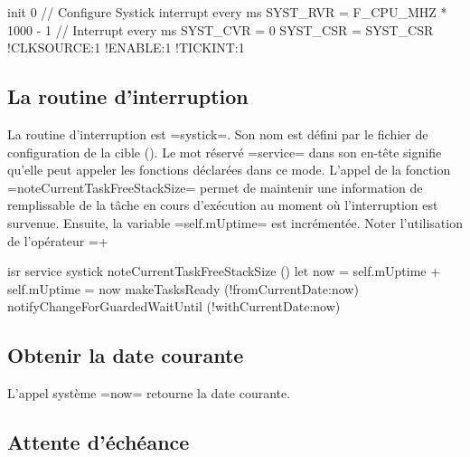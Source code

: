 \begin{PLM}
init 0 { // Configure Systick interrupt every ms
  SYST_RVR = F_CPU_MHZ * 1000 - 1 // Interrupt every ms
  SYST_CVR = 0
  SYST_CSR = {SYST_CSR !CLKSOURCE:1 !ENABLE:1 !TICKINT:1}
}
\end{PLM}


\subsection{La routine d'interruption}

La routine d'interruption est \plm=systick=. Son nom est défini par le fichier de configuration de la cible (). Le mot réservé \plm=service= dans son en-tête signifie qu'elle peut appeler les fonctions déclarées dans ce mode. L'appel de la fonction \plm=noteCurrentTaskFreeStackSize= permet de maintenir une information de remplissable de la tâche en cours d'exécution au moment où l'interruption est survenue. Ensuite, la variable \plm=self.mUptime= est incrémentée. Noter l'utilisation de l'opérateur \plm=+%

\begin{PLM}
isr service systick {
  noteCurrentTaskFreeStackSize ()
  let now = self.mUptime +%
  self.mUptime = now
  makeTasksReady (!fromCurrentDate:now)
  notifyChangeForGuardedWaitUntil (!withCurrentDate:now)
}
\end{PLM}




\subsection{Obtenir la date courante}

L'appel système \plm=now= retourne la date courante.




\subsection{Attente d'échéance}

